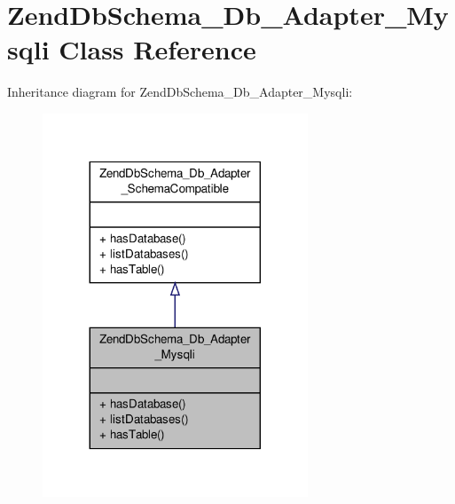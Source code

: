 \hypertarget{classZendDbSchema__Db__Adapter__Mysqli}{\section{Zend\-Db\-Schema\-\_\-\-Db\-\_\-\-Adapter\-\_\-\-Mysqli Class Reference}
\label{classZendDbSchema__Db__Adapter__Mysqli}
}


Inheritance diagram for Zend\-Db\-Schema\-\_\-\-Db\-\_\-\-Adapter\-\_\-\-Mysqli\-:\nopagebreak
\begin{figure}[H]
\begin{center}
\leavevmode
\includegraphics[width=224pt]{classZendDbSchema__Db__Adapter__Mysqli__inherit__graph}
\end{center}
\end{figure}


